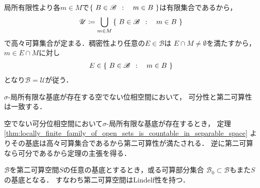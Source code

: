 	\begin{prf}
		局所有限性より各$m \in M$で$\left\{\ B \in \mathscr{B}\ \, : \quad m \in B\ \right\}$は有限集合であるから，
		\begin{align}
			\mathscr{U} \coloneqq \bigcup_{m \in M} \left\{\ B \in \mathscr{B}\ \, : \quad m \in B\ \right\}
		\end{align}
		で高々可算集合が定まる．稠密性より任意の$E \in \mathscr{B}$は
		$E \cap M \neq \emptyset$を満たすから，$m \in E \cap M$に対し
		\begin{align}
			E \in \left\{\ B \in \mathscr{B}\ \, : \quad m \in B\ \right\}
		\end{align}
		となり$\mathscr{B} = \mathscr{U}$が従う．
		\QED	
	\end{prf}
	
	\begin{screen}
		\begin{thm}
			$\sigma$-局所有限な基底が存在する空でない位相空間において，
			可分性と第二可算性は一致する．
		\end{thm}
	\end{screen}
	
	\begin{prf}
		空でない可分位相空間において$\sigma$-局所有限な基底が存在するとき，
		定理\ref{thm:locally_finite_family_of_open_sets_is_countable_in_separable_space}
		よりその基底は高々可算集合であるから第二可算性が満たされる．
		逆に第二可算なら可分であるから定理の主張を得る．
		\QED
	\end{prf}
	
	\begin{screen}
		\begin{thm}[第二可算空間の任意の基底は可算基を内包する]\label{thm:countable_base_of_second_countable_space}
			$\mathscr{B}$を第二可算空間$S$の任意の基底とするとき，或る可算部分集合
			$\mathscr{B}_0 \subset \mathscr{B}$もまた$S$の基底となる．
			すなわち第二可算空間はLindel\Ddot{o}f性を持つ．
		\end{thm}
	\end{screen}
	
